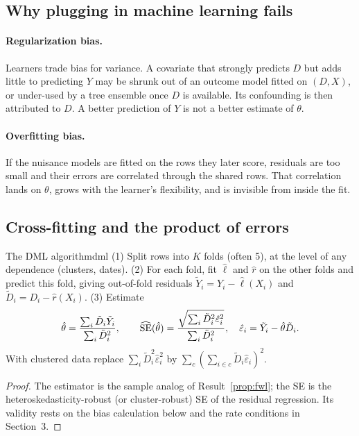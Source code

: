 \documentclass[11pt]{article}
\begin{document}
\subsection{Why plugging in machine learning fails}

\paragraph{Regularization bias.} Learners trade bias for variance. A covariate that strongly predicts $D$ but adds little to
predicting $Y$ may be shrunk out of an outcome model fitted on $(D, X)$, or under-used by a tree ensemble once $D$ is available.
Its confounding is then attributed to $D$. A better prediction of $Y$ is not a better estimate of $\theta$.

\paragraph{Overfitting bias.} If the nuisance models are fitted on the rows they later score, residuals are too small and their
errors are correlated through the shared rows. That correlation lands on $\theta$, grows with the learner's flexibility, and is
invisible from inside the fit.

\subsection{Cross-fitting and the product of errors}

\begin{prop}{The DML algorithm}{dml}
(1) Split rows into $K$ folds (often 5), at the level of any dependence (clusters, dates). (2) For each fold, fit $\hat\ell$ and $\hat r$
on the other folds and predict this fold, giving out-of-fold residuals $\tilde Y_i = Y_i - \hat\ell(X_i)$ and $\tilde D_i = D_i - \hat r(X_i)$.
(3) Estimate
\[
  \hat\theta = \frac{\sum_i\tilde D_i\tilde Y_i}{\sum_i\tilde D_i^2}, \qquad
  \widehat{\operatorname{SE}}(\hat\theta) = \frac{\sqrt{\sum_i\tilde D_i^2\hat\varepsilon_i^2}}{\sum_i\tilde D_i^2}, \quad \hat\varepsilon_i = \tilde Y_i - \hat\theta\tilde D_i .
\]
With clustered data replace $\sum_i\tilde D_i^2\hat\varepsilon_i^2$ by $\sum_c(\sum_{i \in c}\tilde D_i\hat\varepsilon_i)^2$.
\end{prop}
\begin{proof}
The estimator is the sample analog of Result~\ref{prop:fwl}; the SE is the heteroskedasticity-robust (or cluster-robust) SE of
the residual regression. Its validity rests on the bias calculation below and the rate conditions in Section~3.
\end{proof}
\end{document}
